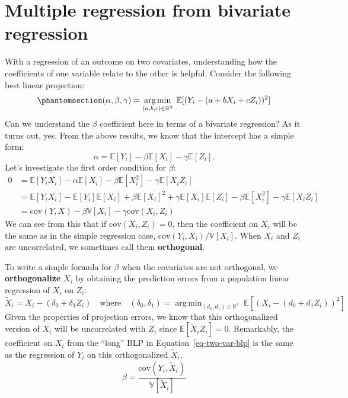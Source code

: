 \documentclass[
  13pt,
  letterpaper,
  DIV=11,
  numbers=noendperiod]{scrreprt}
\newcommand{\E}{\mathbb{E}}
\newcommand{\V}{\mathbb{V}}
\newcommand{\cov}{\text{cov}}
\DeclareMathOperator*{\argmin}{arg\,min}
\theoremstyle{definition}
\theoremstyle{definition}
\theoremstyle{plain}
\theoremstyle{remark}
\begin{document}
\section{Multiple regression from bivariate regression}\label{sec-fwl}

With a regression of an outcome on two covariates, understanding how the
coefficients of one variable relate to the other is helpful. Consider
the following best linear projection:
\begin{equation}\phantomsection\label{eq-two-var-blp}{ 
(\alpha, \beta, \gamma) = \argmin_{(a,b,c) \in \mathbb{R}^{3}} \; \E[(Y_{i} - (a + bX_{i} + cZ_{i}))^{2}]
}\end{equation} Can we understand the \(\beta\) coefficient here in
terms of a bivariate regression? As it turns out, yes. From the above
results, we know that the intercept has a simple form: \[
\alpha = \E[Y_i] - \beta\E[X_i] - \gamma\E[Z_i].
\] Let's investigate the first order condition for \(\beta\): \[ 
\begin{aligned}
  0 &= \E[Y_{i}X_{i}] - \alpha\E[X_{i}] - \beta\E[X_{i}^{2}] - \gamma\E[X_{i}Z_{i}] \\
    &= \E[Y_{i}X_{i}] - \E[Y_{i}]\E[X_{i}] + \beta\E[X_{i}]^{2} + \gamma\E[X_{i}]\E[Z_{i}] - \beta\E[X_{i}^{2}] - \gamma\E[X_{i}Z_{i}] \\
  &= \cov(Y, X) - \beta\V[X_{i}] - \gamma \cov(X_{i}, Z_{i})
\end{aligned}
\] We can see from this that if \(\cov(X_{i}, Z_{i}) = 0\), then the
coefficient on \(X_i\) will be the same as in the simple regression
case, \(\cov(Y_{i}, X_{i})/\V[X_{i}]\). When \(X_i\) and \(Z_i\) are
uncorrelated, we sometimes call them \textbf{orthogonal}.

To write a simple formula for \(\beta\) when the covariates are not
orthogonal, we \textbf{orthogonalize} \(X_i\) by obtaining the
prediction errors from a population linear regression of \(X_i\) on
\(Z_i\): \[ 
\widetilde{X}_{i} = X_{i} - (\delta_{0} + \delta_{1}Z_{i}) \quad\text{where}\quad (\delta_{0}, \delta_{1}) = \argmin_{(d_{0},d_{1}) \in \mathbb{R}^{2}} \; \E[(X_{i} - (d_{0} + d_{1}Z_{i}))^{2}]
\] Given the properties of projection errors, we know that this
orthogonalized version of \(X_{i}\) will be uncorrelated with \(Z_{i}\)
since \(\E[\widetilde{X}_{i}Z_{i}] = 0\). Remarkably, the coefficient on
\(X_i\) from the ``long'' BLP in Equation~\ref{eq-two-var-blp} is the
same as the regression of \(Y_i\) on this orthogonalized
\(\widetilde{X}_i\), \[ 
\beta = \frac{\text{cov}(Y_{i}, \widetilde{X}_{i})}{\V[\widetilde{X}_{i}]}
\]
\end{document}
